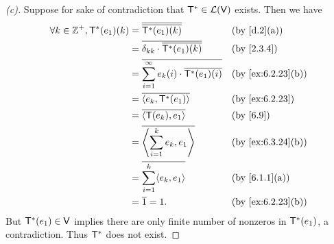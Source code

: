 \begin{proof}[(c)]
	Suppose for sake of contradiction that \(\mathsf{T}^* \in \mathcal{L}(\mathsf{V})\) exists.
	Then we have
	\begin{align*}
		\forall k \in \Z^+, \T^*(e_1)(k) & = \conj{\conj{\T^*(e_1)(k)}}                                  &  & \by{d.2}[a]       \\
		                                 & = \conj{\delta_{k k} \cdot \conj{\T^*(e_1)(k)}}               &  & \by{2.3.4}        \\
		                                 & = \conj{\sum_{i = 1}^\infty e_k(i) \cdot \conj{\T^*(e_1)(i)}} &  & \by{ex:6.2.23}[b] \\
		                                 & = \conj{\inn{e_k, \T^*(e_1)}}                                 &  & \by{ex:6.2.23}    \\
		                                 & = \conj{\inn{\T(e_k), e_1}}                                   &  & \by{6.9}          \\
		                                 & = \conj{\inn{\sum_{i = 1}^k e_k, e_1}}                        &  & \by{ex:6.3.24}[b] \\
		                                 & = \conj{\sum_{i = 1}^k \inn{e_k, e_1}}                        &  & \by{6.1.1}[a]     \\
		                                 & = \conj{1} = 1.                                               &  & \by{ex:6.2.23}[b]
	\end{align*}
	But \(\mathsf{T}^*(e_1) \in \mathsf{V}\) implies there are only finite number of nonzeros in \(\mathsf{T}^*(e_1)\), a contradiction.
	Thus \(\mathsf{T}^*\) does not exist.
\end{proof}
